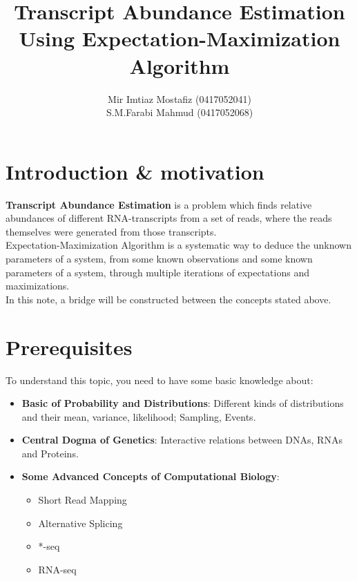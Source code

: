 \documentclass[10pt,a4paper]{article}
\title{\textbf{Transcript Abundance Estimation Using Expectation-Maximization Algorithm}}
\author{Mir Imtiaz Mostafiz (0417052041)\\
		S.M.Farabi Mahmud (0417052068)\\
		}
\date{}
\begin{document}
\maketitle

\section*{Introduction \& motivation}
\textbf{Transcript Abundance Estimation} is a problem which finds relative abundances of different RNA-transcripts from a set of reads, where the reads themselves were generated from those transcripts.\\
Expectation-Maximization Algorithm is a systematic way to deduce the unknown parameters of a system, from some known observations and some known parameters of a system, through multiple iterations of expectations and maximizations.\\
In this note, a bridge will be constructed between the concepts stated above.

\section*{Prerequisites}
To understand this topic, you need to have some basic knowledge about:
\begin{itemize}
\item \textbf{Basic of Probability and Distributions}: Different kinds of distributions and their mean, variance, likelihood; Sampling, Events.
\item \textbf{Central Dogma of Genetics}: Interactive relations between DNAs, RNAs and Proteins.
\item \textbf{Some Advanced Concepts of Computational Biology}:
\begin{itemize}
    \item Short Read Mapping
    \item Alternative Splicing
    \item *-seq
    \item RNA-seq
\end{itemize}



\end{itemize}
\end{document}
